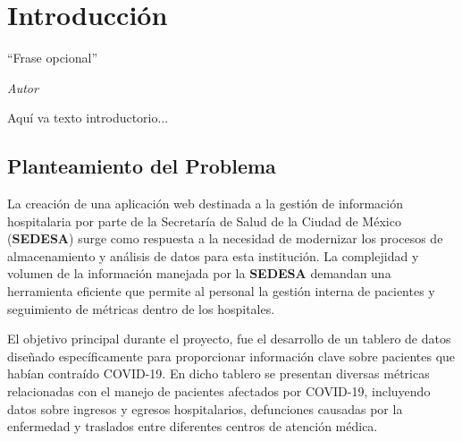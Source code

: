\chapter{\bf{Introducción}}\label{cap:intro}
\epigraph{``Frase opcional''
}{\textit{Autor}}

Aquí va texto introductorio...

\section{Planteamiento del Problema}\label{intro_mot}

La creación de una aplicación web destinada a la gestión de información hospitalaria por parte de la Secretaría de Salud de la Ciudad de México (\textbf{SEDESA}) surge como respuesta a la necesidad de modernizar los procesos de almacenamiento y análisis de datos para esta institución. La complejidad y volumen de la información manejada por la \textbf{SEDESA} demandan una herramienta eficiente que permite al personal la gestión interna de pacientes y seguimiento de métricas dentro de los hospitales.

El objetivo principal durante el proyecto, fue el desarrollo de un tablero de datos diseñado específicamente para proporcionar información clave sobre pacientes que habían contraído \textsc{COVID-19}.
En dicho tablero se presentan diversas métricas relacionadas con el manejo de pacientes afectados por \textsc{COVID-19}, incluyendo datos sobre ingresos y egresos hospitalarios, defunciones causadas por la enfermedad y traslados entre diferentes centros de atención médica.\\

